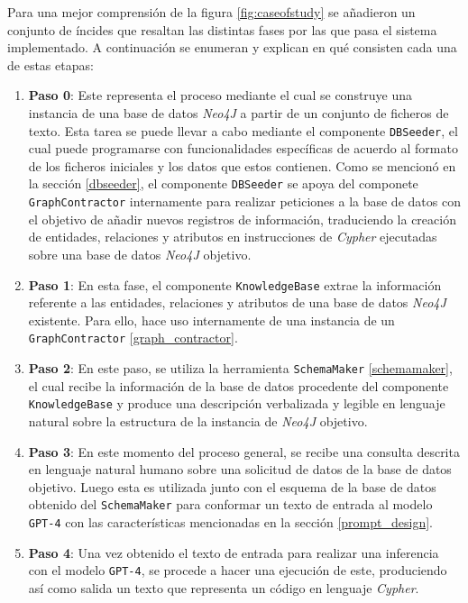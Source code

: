 Para una mejor comprensión de la figura \ref{fig:caseofstudy} se añadieron un conjunto de íncides que resaltan las distintas fases por las que pasa el sistema implementado. A continuación se enumeran y explican en qué consisten cada una de estas etapas:

\begin{enumerate} \label{pipeline_algorithm}

\item \textbf{Paso 0}: Este representa el proceso mediante el cual se construye una instancia de una base de datos \textit{Neo4J}  a partir de un conjunto de ficheros de texto. Esta tarea se puede llevar a cabo mediante el componente \texttt{DBSeeder}, el cual puede programarse con funcionalidades específicas de acuerdo al formato de los ficheros iniciales y los datos que estos contienen. Como se mencionó en la sección \ref{dbseeder}, el componente \texttt{DBSeeder} se apoya del componete \texttt{GraphContractor} internamente para realizar peticiones a la base de datos con el objetivo de añadir nuevos registros de información, traduciendo la creación de entidades, relaciones y atributos en instrucciones de \textit{Cypher} ejecutadas sobre una base de datos \textit{Neo4J} objetivo.

\item \textbf{Paso 1}: En esta fase, el componente \texttt{KnowledgeBase} extrae la información referente a las entidades, relaciones y atributos de una base de datos \textit{Neo4J} existente. Para ello, hace uso internamente de una instancia de un \texttt{GraphContractor} \ref{graph_contractor}.

\item \textbf{Paso 2}: En este paso, se utiliza la herramienta \texttt{SchemaMaker} \ref{schemamaker}, el cual recibe la información de la base de datos procedente del componente \texttt{KnowledgeBase} y produce una descripción verbalizada y legible en lenguaje natural sobre la estructura de la instancia de \textit{Neo4J} objetivo.

\item \textbf{Paso 3}: En este momento del proceso general, se recibe una consulta descrita en lenguaje natural humano sobre una solicitud de datos de la base de datos objetivo. Luego esta es utilizada junto con el esquema de la base de datos obtenido del \texttt{SchemaMaker}  para conformar un texto de entrada al modelo \texttt{GPT-4} con las características mencionadas en la sección \ref{prompt_design}.

\item \textbf{Paso 4}: Una vez obtenido el texto de entrada para realizar una inferencia con el modelo \texttt{GPT-4}, se procede a hacer una ejecución de este, produciendo así como salida un texto que representa un código en lenguaje \textit{Cypher}.


\end{enumerate}
